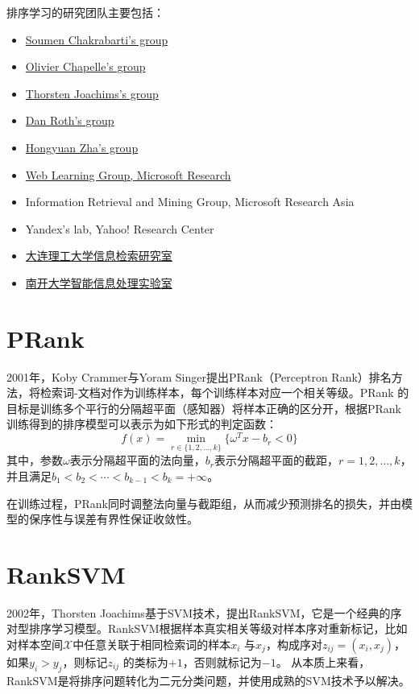 排序学习的研究团队主要包括：
\begin{itemize}
\item \href{http://www.cse.iitb.ac.in/\~soumen/}{Soumen Chakrabarti's group}
\item \href{http://olivier.chapelle.cc/index.html}{Olivier Chapelle's group}
\item \href{http://www.cs.cornell.edu/People/tj/}{Thorsten Joachims's group}
\item \href{http://l2r.cs.uiuc.edu/~cogcomp/projects.php}{Dan Roth's group}
\item \href{http://www.cc.gatech.edu/\~zha/}{Hongyuan Zha's group}
\item \href{http://research.microsoft.com/\~cburges/}{Web Learning Group, Microsoft Research}
\item Information Retrieval and Mining Group, Microsoft Research Asia
\item Yandex's lab, Yahoo! Research Center
\item \href{http://ir.dlut.edu.cn/}{大连理工大学信息检索研究室}
\item \href{http://kdd.nankai.edu.cn/IIP/jsp/index/index.jsp}{南开大学智能信息处理实验室}
\end{itemize}

\section{PRank}
2001年，Koby Crammer与Yoram Singer\cite{crammer2001pranking}提出PRank（Perceptron Rank）排名方法，将检索词-文档对作为训练样本，每个训练样本对应一个相关等级。PRank 的目标是训练多个平行的分隔超平面（感知器）将样本正确的区分开，根据PRank 训练得到的排序模型可以表示为如下形式的判定函数：
\begin{equation}\label{eq:pranking}
    f(x) = \min \limits_{r\in \{1,2,\ldots, k\}}\{\omega^T x - b_r < 0\}
\end{equation}
其中，参数$\omega$表示分隔超平面的法向量，$b_r$表示分隔超平面的截距，$r=1,2,\ldots,k$，并且满足$b_1 < b_2 < \cdots < b_{k-1} < b_k = + \infty$。

在训练过程，PRank同时调整法向量与截距组，从而减少预测排名的损失，并由模型的保序性与误差有界性保证收敛性。

\section{RankSVM}
2002年，Thorsten Joachims\cite{joachims2002optimizing}基于SVM技术，提出RankSVM，它是一个经典的序对型排序学习模型。RankSVM根据样本真实相关等级对样本序对重新标记，比如对样本空间$\mathcal{X}$中任意关联于相同检索词的样本$x_i$ 与$x_j$，构成序对$z_{ij} = (x_i,x_j)$，如果$y_i > y_j$，则标记$z_{ij}$ 的类标为$+1$，否则就标记为$-1$。 从本质上来看，RankSVM是将排序问题转化为二元分类问题，并使用成熟的SVM技术予以解决。

